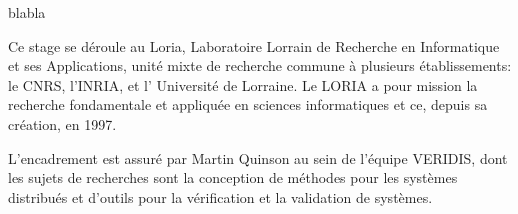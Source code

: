 {\color{white} blabla} \vspace{7cm}

Ce stage se déroule au Loria, Laboratoire Lorrain de Recherche en Informatique
et ses Applications, unité mixte de recherche commune à plusieurs
établissements: le CNRS, l'INRIA, et l' Université de Lorraine. Le LORIA a pour
mission la recherche fondamentale et appliquée en sciences informatiques et ce,
depuis sa création, en 1997.

L'encadrement est assuré par Martin Quinson au sein de l'équipe VERIDIS, dont les sujets de recherches sont la conception de méthodes pour les systèmes distribués et d'outils pour la vérification et la validation de systèmes.


